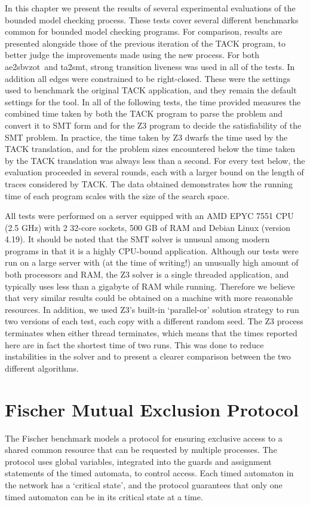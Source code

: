 \documentclass[a4paper,11pt]{report}
\theoremstyle{definition}
\newcommand{\aez}{ae2sbvzot}
\begin{document}
In this chapter we present the results of several experimental evaluations of
the bounded model checking process. These tests cover several different
benchmarks common for bounded model checking programs. For comparison, results
are presented alongside those of the previous iteration of the TACK program, to
better judge the improvements made using the new process.
For both \aez\ and ta2smt, strong transition liveness was used in all of the
tests. In addition all edges were constrained to be right-closed. These were the
settings used to benchmark the original TACK application, and they remain the
default settings for the tool. In all of the following tests, the time provided
measures the combined time taken by both the TACK program to parse the problem
and convert it to SMT form and for the Z3 program to decide the satisfiability
of the SMT problem. In practice, the time taken by Z3 dwarfs the time used by
the TACK translation, and for the problem sizes encountered below the time taken
by the TACK translation was always less than a second. For every test below, the
evaluation proceeded in several rounds, each with a larger bound on the length
of traces considered by TACK\@. The data obtained demonstrates how the running
time of each program scales with the size of the search space.

All tests were performed on a server equipped with an AMD EPYC 7551 CPU (2.5
GHz) with 2 32-core sockets, 500 GB of RAM and Debian Linux (version 4.19). It
should be noted that the SMT solver is unusual among modern programs in that it
is a highly CPU-bound application. Although our tests were run on a large server
with (at the time of writing!) an unusually high amount of both processors and
RAM, the Z3 solver is a single threaded application, and typically uses less
than a gigabyte of RAM while running. Therefore we believe that very similar
results could be obtained on a machine with more reasonable resources. In
addition, we used Z3's built-in `parallel-or' solution strategy to run two
versions of each test, each copy with a different random seed. The Z3 process
terminates when either thread terminates, which means that the times reported
here are in fact the shortest time of two runs. This was done to reduce
instabilities in the solver and to present a clearer comparison between the two
different algorithms.



\section{Fischer Mutual Exclusion Protocol}\label{evaluation-fischer}
The Fischer benchmark models a protocol for ensuring exclusive access to a
shared common resource that can be requested by multiple processes. The protocol
uses global variables, integrated into the guards and assignment statements of
the timed automata, to control access. Each timed automaton in the network has a
`critical state', and the protocol guarantees that only one timed automaton can
be in its critical state at a time.
\end{document}
